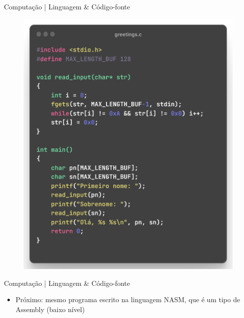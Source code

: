 \documentclass{beamer}
\begin{document}
\begin{frame}{Computação | Linguagem \& Código-fonte}
    \begin{figure}
        \centering
        \includegraphics[width=0.4\linewidth]{img/greetings-code/greetings-c.png}
    \end{figure}
\end{frame}

\begin{frame}{Computação | Linguagem \& Código-fonte}
    \begin{itemize}
        \item Próximo: mesmo programa escrito na linguagem NASM, que é um tipo de Assembly (baixo nível)
    \end{itemize}
\end{frame}
\end{document}
